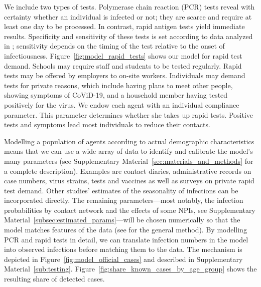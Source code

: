 We include two types of tests. Polymerase chain reaction (PCR) tests reveal with
certainty whether an individual is infected or not; they are scarce and require at least
one day to be processed. In contrast, rapid antigen tests yield immediate results.
Specificity and sensitivity of these tests is set according to data analyzed in
\cite{Bruemmer2021, Smith2021}; sensitivity depends on the timing of the test relative
to the onset of infectiousness. Figure~\ref{fig:model_rapid_tests} shows our model for
rapid test demand. Schools may require staff and students to be tested regularly. Rapid
tests may be offered by employers to on-site workers. Individuals may demand tests for
private reasons, which include having plans to meet other people, showing symptoms of
CoViD-19, and a household member having tested positively for the virus. We endow each
agent with an individual compliance parameter. This parameter determines whether she
takes up rapid tests. Positive tests and symptoms lead most individuals to reduce their
contacts.

Modelling a population of agents according to actual demographic characteristics means
that we can use a wide array of data to identify and calibrate the model's many
parameters (see Supplementary Material~\ref{sec:materials_and_methods} for a
complete description). Examples are contact diaries, administrative records on case
numbers, virus strains, tests and vaccines as well as surveys on private rapid test
demand. Other studies' estimates of the seasonality of infections can be incorporated
directly. The remaining parameters---most notably, the infection probabilities by
contact network and the effects of some NPIs, see Supplementary
Material~\ref{subsec:estimated_params}---will be chosen numerically so that the model
matches features of the data (see \cite{McFadden1989} for the general method). By
modelling PCR and rapid tests in detail, we can translate infection numbers in the model
into observed infections before matching them to the data. The mechanism is depicted in
Figure~\ref{fig:model_official_cases} and described in Supplementary
Material~\ref{sub:testing}. Figure~\ref{fig:share_known_cases_by_age_group} shows the
resulting share of detected cases.

